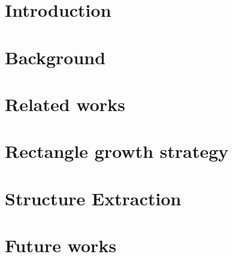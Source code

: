 \documentclass{report}
\begin{document}
\chapter{Introduction}


\chapter{Background}


\chapter{Related works}


\chapter{Rectangle growth strategy}


\chapter{Structure Extraction}



\chapter{Future works}



\nocite{*} %


\end{document}

